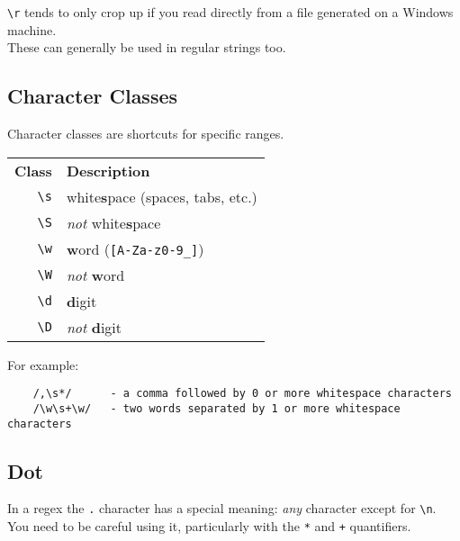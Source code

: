 \texttt{\textbackslash r} tends to only crop up if you read directly from a file generated on a Windows machine.
\\

These can generally be used in regular strings too.

\pagebreak

\subsection{Character Classes}

Character classes are shortcuts for specific ranges.

\begin{center}
    \begin{small}
        \begin{tabularx}{\textwidth}{r l}
            \textbf{Class}                    & \textbf{Description} \\
            \texttt{\textbackslash s}         & white\textbf{s}pace (spaces, tabs, etc.) \\
            \texttt{\textbackslash S}         & \textit{not} white\textbf{s}pace \\
            \texttt{\textbackslash w}         & \textbf{w}ord (\texttt{[A-Za-z0-9\_]}) \\
            \texttt{\textbackslash W}         & \textit{not} \textbf{w}ord \\
            \texttt{\textbackslash d}         & \textbf{d}igit \\
            \texttt{\textbackslash D}         & \textit{not} \textbf{d}igit
        \end{tabularx}
    \end{small}
\end{center}

For example:

\begin{verbatim}
    /,\s*/      - a comma followed by 0 or more whitespace characters
    /\w\s+\w/   - two words separated by 1 or more whitespace characters
\end{verbatim}


\subsection{Dot}

In a regex the \texttt{.} character has a special meaning: \textit{any} character except for \texttt{\textbackslash n}. You need to be careful using it, particularly with the \texttt{*} and \texttt{+} quantifiers.


